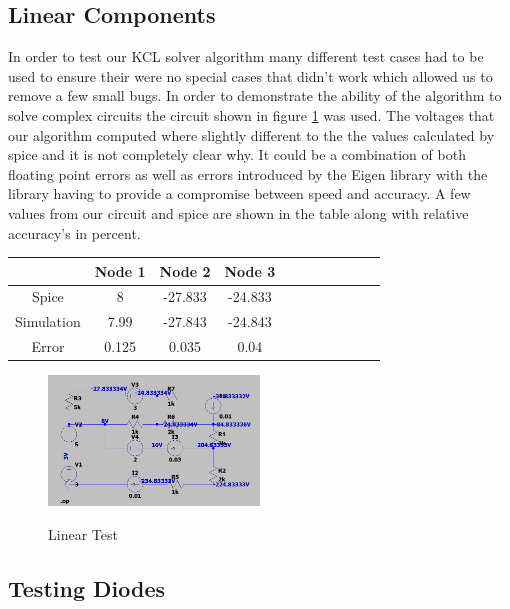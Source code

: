 \documentclass{article}
\begin{document}
\subsection{Linear Components}
In order to test our KCL solver algorithm many different test cases had to be used to ensure their were no special cases that didn't work which allowed us to remove a few small bugs. In order to demonstrate the ability of the algorithm to solve complex circuits the circuit shown in figure \ref{fig:LinearTest} was used. The voltages that our algorithm computed where slightly different to the the values calculated by spice and it is not completely clear why. It could be a combination of both floating point errors as well as errors introduced by the Eigen library with the library having to provide a compromise between speed and accuracy. A few values from our circuit and spice are shown in the table along with relative accuracy's in percent. 
\begin{center}
\begin{tabular}{ ||c|| c |c | c | c | c | c | c | c | c | c ||}
 \hline
  & Node 1 & Node 2 & Node 3\\  
  \hline
 Spice & 8 & -27.833 & -24.833\\   
 Simulation & 7.99 & -27.843 & -24.843\\
 Error & 0.125 & 0.035 & 0.04\\ 
 \hline
\end{tabular}
\end{center}
\begin{figure}[h]
    \caption{Linear Test}
    \centering
    \includegraphics[width=0.5\textwidth]{images/LinearTest.png}
    \label{fig:LinearTest}
\end{figure}
\subsection{Testing Diodes}
\end{document}
